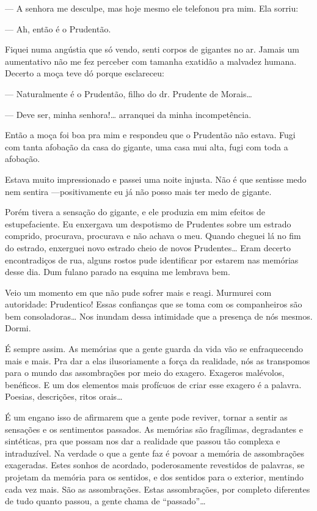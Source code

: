 --- A senhora me desculpe, mas hoje mesmo ele telefonou pra mim. Ela
sorriu:

--- Ah, então é o Prudentão.

Fiquei numa angústia que só vendo, senti corpos de gigantes no ar.
Jamais um aumentativo não me fez perceber com tamanha exatidão a
malvadez humana. Decerto a moça teve dó porque esclareceu:

--- Naturalmente é o Prudentão, filho do dr. Prudente de Morais\ldots{}

--- Deve ser, minha senhora!\ldots{} arranquei da minha incompetência.

Então a moça foi boa pra mim e respondeu que o Prudentão não estava.
Fugi com tanta afobação da casa do gigante, uma casa mui alta, fugi com
toda a afobação.

Estava muito impressionado e passei uma noite injusta. Não é que
sentisse medo nem sentira ---positivamente eu já não posso mais ter medo
de gigante.

Porém tivera a sensação do gigante, e ele produzia em mim efeitos de
estupefaciente. Eu enxergava um despotismo de Prudentes sobre um estrado
comprido, procurava, procurava e não achava o meu. Quando cheguei lá no
fim do estrado, enxerguei novo estrado cheio de novos Prudentes\ldots{} Eram
decerto encontradiços de rua, alguns rostos pude identificar por estarem
nas memórias desse dia. Dum fulano parado na esquina me lembrava bem.

Veio um momento em que não pude sofrer mais e reagi. Murmurei com
autoridade: Prudentico! Essas confianças que se toma com os companheiros
são bem consoladoras\ldots{} Nos inundam dessa intimidade que a presença de
nós mesmos. Dormi.

É sempre assim. As memórias que a gente guarda da vida vão se
enfraquecendo mais e mais. Pra dar a elas ilusoriamente a força da
realidade, nós as transpomos para o mundo das assombrações por meio do
exagero. Exageros malévolos, benéficos. E um dos elementos mais
profícuos de criar esse exagero é a palavra. Poesias, descrições, ritos
orais\ldots{}

É um engano isso de afirmarem que a gente pode reviver, tornar a sentir
as sensações e os sentimentos passados. As memórias são fragílimas,
degradantes e sintéticas, pra que possam nos dar a realidade que passou
tão complexa e intraduzível. Na verdade o que a gente faz é povoar a
memória de assombrações exageradas. Estes sonhos de acordado,
poderosamente revestidos de palavras, se projetam da memória para os
sentidos, e dos sentidos para o exterior, mentindo cada vez mais. São as
assombrações. Estas assombrações, por completo diferentes de tudo quanto
passou, a gente chama de ``passado''\ldots{}

